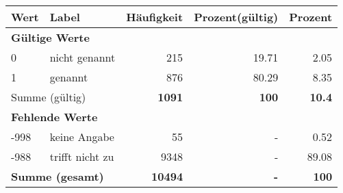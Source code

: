      \begin{longtable}{lXrrr}
     \toprule
     \textbf{Wert} & \textbf{Label} & \textbf{Häufigkeit} & \textbf{Prozent(gültig)} & \textbf{Prozent} \\
     \endhead
     \midrule
     \multicolumn{5}{l}{\textbf{Gültige Werte}}\\

     0 &
     \multicolumn{1}{X}{ nicht genannt   } &


       \num{215} &
       \num[round-mode=places,round-precision=2]{19,71} &
         \num[round-mode=places,round-precision=2]{2,05} \\

     1 &
     \multicolumn{1}{X}{ genannt   } &


       \num{876} &
       \num[round-mode=places,round-precision=2]{80,29} &
         \num[round-mode=places,round-precision=2]{8,35} \\
     \midrule
     \multicolumn{2}{l}{Summe (gültig)} &
       \textbf{\num{1091}} &
     \textbf{100} &
       \textbf{\num[round-mode=places,round-precision=2]{10,4}} \\
     \multicolumn{5}{l}{\textbf{Fehlende Werte}}\\
       -998 &
       keine Angabe &
         \num{55} &
        - &
         \num[round-mode=places,round-precision=2]{0,52} \\
       -988 &
       trifft nicht zu &
         \num{9348} &
        - &
         \num[round-mode=places,round-precision=2]{89,08} \\
     \midrule
     \multicolumn{2}{l}{\textbf{Summe (gesamt)}} &
          \textbf{\num{10494}} &
        \textbf{-} &
        \textbf{100} \\
     \bottomrule
     \end{longtable}
     
